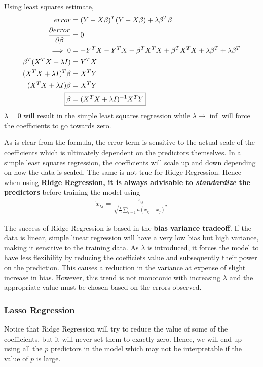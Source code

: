 \documentclass[11pt, a4paper]{article}
\begin{document}
    Using least squares estimate,
    \begin{align*}
        error &= (Y-X\beta)^{T}(Y-X\beta) + \lambda \beta^{T}\beta\\
        \frac{\partial error}{\partial \beta} &= 0\\
        \implies 0 &= -Y^{T}X - Y^{T}X + \beta^{T}X^{T}X + \beta^{T}X^{T}X + \lambda \beta^{T} + \lambda \beta^{T}\\
        \beta^{T}(X^{T}X + \lambda I) &= Y^{T}X\\
        (X^{T}X + \lambda I)^{T}\beta &= X^{T}Y\\
        (X^{T}X + \lambda I)\beta &= X^{T}Y\\
        \Aboxed{\beta &= (X^{T}X + \lambda I)^{-1}X^{T}Y}  
    \end{align*}
    $\lambda = 0$ will result in the simple least squares regression while $\lambda \to \inf$ will force the coefficients to go towards zero.\newline

    As is clear from the formula, the error term is sensitive to the actual scale of the coefficients which is ultimately dependent on the predictors themselves. In a simple least squares regression, the coefficients will scale up and down depending on how the data is scaled. The same is not true for Ridge Regression.\newline
    Hence when using \textbf{Ridge Regression, it is always advisable to \emph{standardize} the predictors} before training the model using
    \begin{align*}
        \tilde{x}_{ij} = \frac{x_{ij}}{\sqrt{\frac{1}{n}\sum_{i=1}{n}(x_{ij}-\bar{x}_{j})^{2}}}
    \end{align*}

    The success of Ridge Regression is based in the \textbf{bias variance tradeoff}. If the data is linear, simple linear regression will have a very low bias but high variance, making it sensitive to the training data. As $\lambda$ is introduced, it forces the model to have less flexibility by reducing the coefficiets value and subsequently their power on the prediction. This causes a reduction in the variance at expense of slight increase in bias. However, this trend is not monotonic with increasing $\lambda$ and the appropriate value must be chosen based on the errors observed. 

    
    \subsubsection{Lasso Regression}
    Notice that Ridge Regression will try to reduce the value of some of the coefficients, but it will never set them to exactly zero. Hence, we will end up using all the $p$ predictors in the model which may not be interpretable if the value of $p$ is large.\newline
\end{document}
